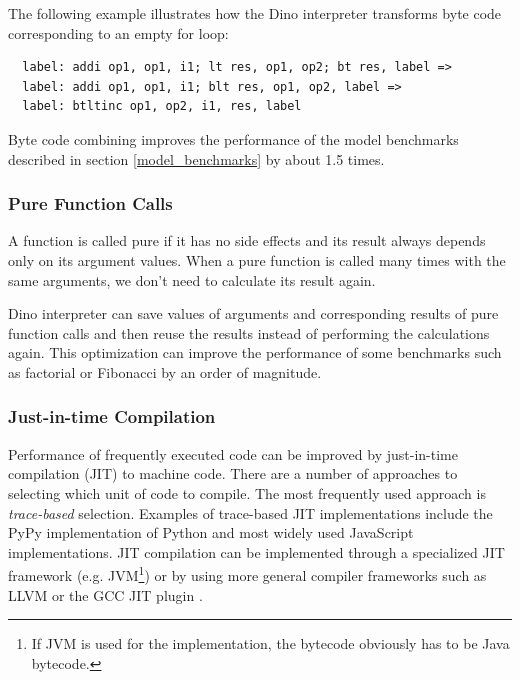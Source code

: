 \documentclass[preprint]{sigplanconf}
\begin{document}
The following example illustrates how the Dino interpreter transforms byte code
corresponding to an empty for loop:

{\scriptsize
\begin{verbatim}
  label: addi op1, op1, i1; lt res, op1, op2; bt res, label =>
  label: addi op1, op1, i1; blt res, op1, op2, label =>
  label: btltinc op1, op2, i1, res, label
\end{verbatim}
}

  Byte code combining improves the performance of the model benchmarks described in section \ref{model_benchmarks} by about 1.5 times.

\subsubsection{Pure Function Calls}

  A function is called pure if it has no side effects and
its result always depends only on its argument values.
  When a pure function is called many times with
the same arguments, we don't need to calculate its result again.

  Dino interpreter can save values of arguments and corresponding
results of pure function calls and then reuse the results instead of
performing the calculations again.  This optimization can improve the performance
of some benchmarks such as factorial or Fibonacci by an order of magnitude.

\subsubsection{Just-in-time Compilation}

  Performance of frequently executed code can be improved by just-in-time
compilation (JIT) to machine code. There are a number of approaches to selecting which unit of 
code to compile. The most frequently used approach is \emph{trace-based} selection.
Examples of trace-based JIT implementations include the PyPy implementation of Python and 
most widely used JavaScript implementations.
JIT compilation can be implemented through a specialized JIT framework
(e.g. JVM\footnote{If JVM is used for the implementation, the bytecode obviously has to be Java bytecode.})
or by using more general compiler frameworks such as LLVM or the GCC JIT plugin \cite{Lattner} \cite{Malcolm}.
\end{document}

